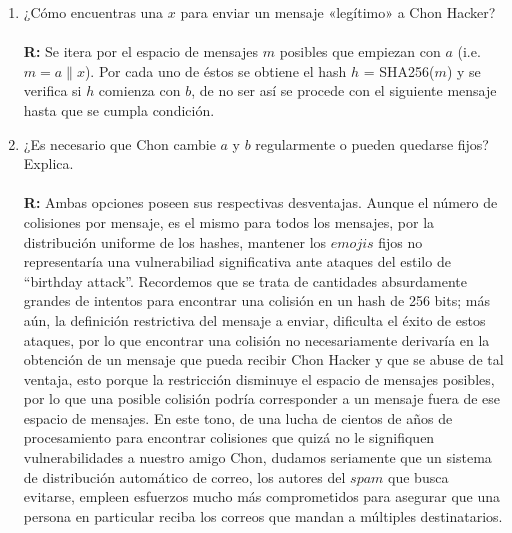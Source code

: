\documentclass[14pt]{article}
\begin{document}
\begin{enumerate}[label=\alph*)]
\item ¿Cómo encuentras una $x$ para enviar un mensaje «legítimo» a Chon Hacker? \\ \\
\textbf{R:} Se itera por el espacio de mensajes $m$ posibles que empiezan con $a$ (i.e. $m = a \parallel x$). Por cada uno de éstos se obtiene el hash $h$ = SHA256($m$)  y se verifica si $h$ comienza con $b$, de no ser así se procede con el siguiente mensaje hasta que se cumpla condición.

\item ¿Es necesario que Chon cambie $a$ y $b$ regularmente o pueden quedarse fijos? Explica. \\ \\
  \textbf{R:} Ambas opciones poseen sus respectivas desventajas. Aunque el número de colisiones por mensaje, es el mismo para todos los mensajes, por la distribución uniforme de los hashes, mantener
  los $emojis$ fijos no representaría una vulnerabiliad significativa ante ataques del estilo de ``birthday attack''. Recordemos que se trata de cantidades absurdamente grandes de intentos para encontrar
  una colisión en un hash de 256 bits; más aún, la definición restrictiva del mensaje a enviar, dificulta el éxito de estos ataques, por lo que encontrar una colisión no necesariamente derivaría en la obtención de un mensaje que pueda recibir Chon Hacker y que se abuse de tal ventaja, esto porque la restricción disminuye el espacio de mensajes posibles, por lo que una posible colisión podría corresponder
  a un mensaje fuera de ese espacio de mensajes. En este tono, de una lucha  de cientos de años de procesamiento para encontrar colisiones que quizá no le signifiquen vulnerabilidades a nuestro amigo Chon, dudamos seriamente que un sistema de distribución automático de correo, los autores del $spam$ que busca evitarse,
  empleen esfuerzos mucho más comprometidos para asegurar que una persona en particular reciba los correos que mandan a múltiples destinatarios.\\


\end{enumerate}
\end{document}
